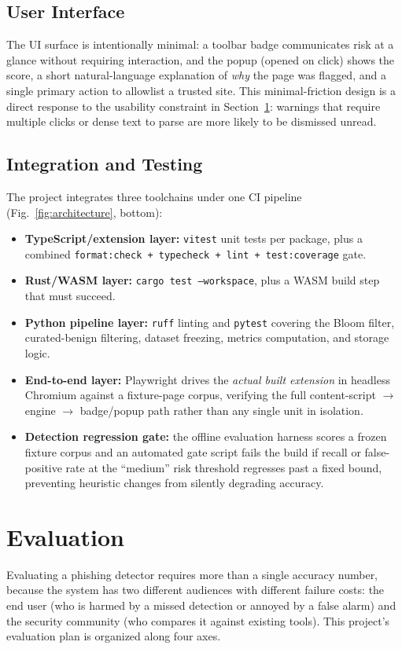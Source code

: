 \documentclass[conference]{IEEEtran}
\begin{document}
\subsection{User Interface}
The UI surface is intentionally minimal: a toolbar badge communicates risk at a glance without requiring interaction, and the popup (opened on click) shows the score, a short natural-language explanation of \emph{why} the page was flagged, and a single primary action to allowlist a trusted site. This minimal-friction design is a direct response to the usability constraint in Section~\ref{sec:eval}: warnings that require multiple clicks or dense text to parse are more likely to be dismissed unread.

\subsection{Integration and Testing}
The project integrates three toolchains under one CI pipeline (Fig.~\ref{fig:architecture}, bottom):
\begin{itemize}
  \item \textbf{TypeScript/extension layer:} \texttt{vitest} unit tests per package, plus a combined \texttt{format:check + typecheck + lint + test:coverage} gate.
  \item \textbf{Rust/WASM layer:} \texttt{cargo test --workspace}, plus a WASM build step that must succeed.
  \item \textbf{Python pipeline layer:} \texttt{ruff} linting and \texttt{pytest} covering the Bloom filter, curated-benign filtering, dataset freezing, metrics computation, and storage logic.
  \item \textbf{End-to-end layer:} Playwright drives the \emph{actual built extension} in headless Chromium against a fixture-page corpus, verifying the full content-script $\rightarrow$ engine $\rightarrow$ badge/popup path rather than any single unit in isolation.
  \item \textbf{Detection regression gate:} the offline evaluation harness scores a frozen fixture corpus and an automated gate script fails the build if recall or false-positive rate at the ``medium'' risk threshold regresses past a fixed bound, preventing heuristic changes from silently degrading accuracy.
\end{itemize}

\section{Evaluation}
\label{sec:eval}
Evaluating a phishing detector requires more than a single accuracy number, because the system has two different audiences with different failure costs: the end user (who is harmed by a missed detection or annoyed by a false alarm) and the security community (who compares it against existing tools). This project's evaluation plan is organized along four axes.
\end{document}
